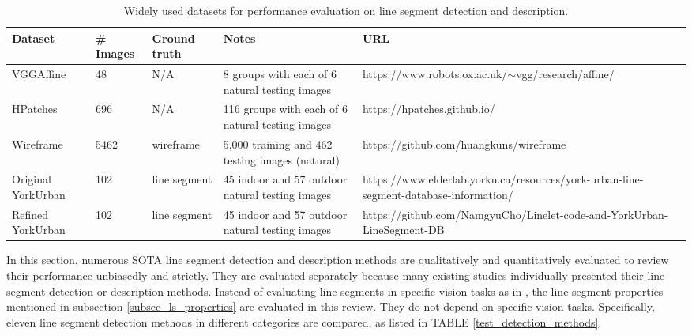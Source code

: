 \documentclass[journal,compsoc]{IEEEtran}
\begin{document}
\begin{table*}[tbp] 	
	\centering 	
	\setlength\tabcolsep{2pt} 	
	\scriptsize 	
	\caption{Widely used datasets for performance evaluation on line segment detection and description.} 	\begin{tabular}{|p{}<{\centering}|p{}<{\centering}|p{}<{\centering}|p{}<{\centering}|p{}<{\centering}|} 		
		\hline 		Dataset           & \# Images & Ground truth           & Notes                                       & URL                                                                                   \\ \hline 		VGGAffine \cite{vggaffine}               & 48        & N/A      & 8 groups with each of 6 natural testing images         & https://www.robots.ox.ac.uk/$\sim$vgg/research/affine/                                \\ \hline 		HPatches \cite{HPatches}          & 696       & N/A      & 116 groups with each of 6 natural testing images       & https://hpatches.github.io/                                                           \\ \hline 		Wireframe \cite{LearningtoParseWireframesinImagesofMan-MadeEnvironments}         & 5462      & wireframe & 5,000 training and 462 testing images (natural) & https://github.com/huangkuns/wireframe                                                \\ \hline 		Original YorkUrban \cite{YorkUrban}         & 102       & line segment           & 45 indoor and 57 outdoor natural testing images             & https://www.elderlab.yorku.ca/resources/york-urban-line-segment-database-information/ \\ \hline 		Refined YorkUrban \cite{ANovelLineletBasedRepresentationforLineSegmentDetection} & 102       & line segment           & 45 indoor and 57 outdoor natural testing images             & https://github.com/NamgyuCho/Linelet-code-and-YorkUrban-LineSegment-DB                \\ \hline 	
	\end{tabular}%
	\label{eva_datasets} 
\end{table*}

In this section, numerous SOTA line segment detection and description methods are qualitatively and quantitatively evaluated to review their performance unbiasedly and strictly. They are evaluated separately because many existing studies individually presented their line segment detection or description methods. Instead of evaluating line segments in specific vision tasks as in \cite{EVOLIN}, the line segment properties mentioned in subsection \ref{subsec_ls_properties} are evaluated in this review. They do not depend on specific vision tasks. Specifically, eleven line segment detection methods in different categories are compared, as listed in TABLE \ref{test_detection_methods}.
\end{document}
